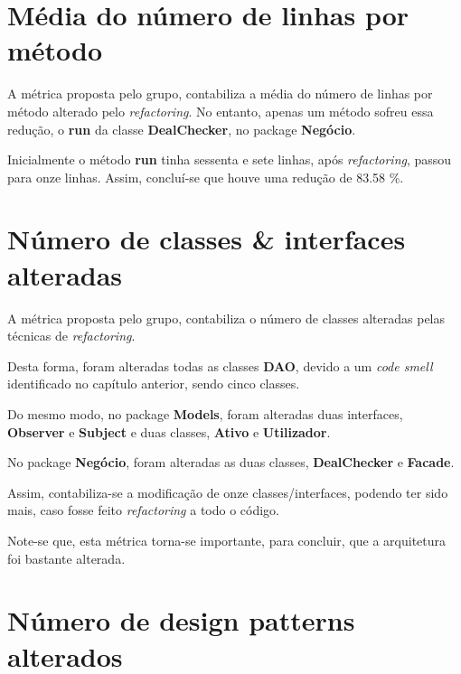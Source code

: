 \section{Média do número de linhas por método}
\hspace{5mm} A métrica proposta pelo grupo, contabiliza a média do número de linhas por método alterado pelo \emph{refactoring}. No entanto, apenas um método sofreu essa redução, o \textbf{run} da classe \textbf{DealChecker}, no package \textbf{Negócio}.

\hspace{5mm} Inicialmente o método \textbf{run} tinha sessenta e sete linhas, após \emph{refactoring}, passou para onze linhas. Assim, concluí-se que houve uma redução de 83.58 \%.

\section{Número de classes \& interfaces alteradas}
\hspace{5mm} A métrica proposta pelo grupo, contabiliza o número de classes alteradas pelas técnicas de \emph{refactoring}. 

\hspace{5mm} Desta forma, foram alteradas todas as classes \textbf{DAO}, devido a um \emph{code smell} identificado no capítulo anterior, sendo cinco classes. 

\hspace{5mm} Do mesmo modo, no package \textbf{Models}, foram alteradas duas interfaces, \textbf{Observer} e \textbf{Subject} e duas classes, \textbf{Ativo} e \textbf{Utilizador}. 

\hspace{5mm} No package \textbf{Negócio}, foram alteradas as duas classes, \textbf{DealChecker} e \textbf{Facade}. 

\hspace{5mm} Assim, contabiliza-se a modificação de onze classes/interfaces, podendo ter sido mais, caso fosse feito \emph{refactoring} a todo o código.

\hspace{5mm} Note-se que, esta métrica torna-se importante, para concluir, que a arquitetura foi bastante alterada.

\section{Número de design patterns alterados}

